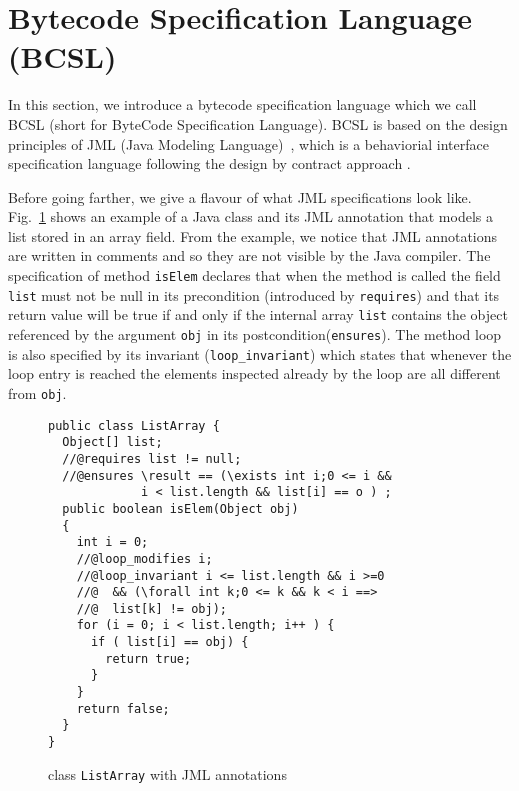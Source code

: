 
\section{Bytecode Specification Language (BCSL)}\label{bcSpecLg}

In this section, we introduce a bytecode specification language which we call BCSL (short for ByteCode Specification Language).
 BCSL is based on the design principles of JML (Java Modeling Language)~\cite{RT03djml,JMLRefMan}, which is a behaviorial interface specification 
language following the design by contract approach \cite{M97oos}.


Before going farther, we give a flavour of what JML specifications look like. Fig.~\ref{replaceSrc} shows an example of a Java class and its 
JML annotation that models a list stored in an array field. 
From the example, we notice that JML annotations are written in comments and so they are not visible by the Java compiler.
The specification of method \verb!isElem! declares
 that when the method is called the field \verb!list! must not be null in its precondition (introduced by \verb!requires!) and that its return value will be true if and only if the internal array 
\verb!list! contains the object referenced by the argument \verb!obj! in its postcondition(\verb!ensures!). The method loop is also specified by
its invariant (\verb!loop_invariant!) which states that whenever the loop entry is reached the elements inspected already by the loop are all different from \verb!obj!.

 
\begin{figure}[!h]
\begin{verbatim}
public class ListArray {
  Object[] list;
  //@requires list != null;
  //@ensures \result == (\exists int i;0 <= i && 
             i < list.length && list[i] == o ) ; 
  public boolean isElem(Object obj)
  {
    int i = 0;
    //@loop_modifies i;
    //@loop_invariant i <= list.length && i >=0 
    //@  && (\forall int k;0 <= k && k < i ==> 
    //@  list[k] != obj); 
    for (i = 0; i < list.length; i++ ) {
      if ( list[i] == obj) {
        return true;	
      }
    }
    return false;
  }
}
\end{verbatim}
\caption{\sc class \texttt{ListArray} with JML annotations} 
\label{replaceSrc}
\end{figure}

